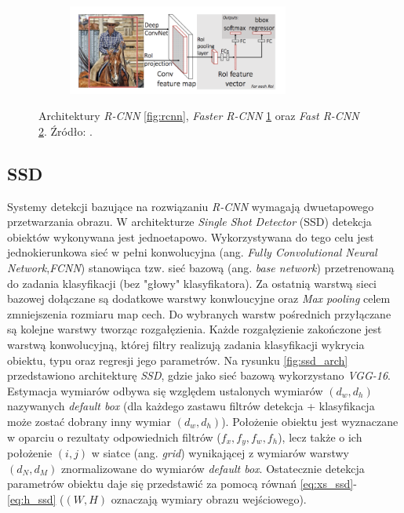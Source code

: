 \begin{figure}
\begin{subfigure}[b]{0.48\textwidth}
         \caption{}
         \label{fig:ffrcnn}
     \end{subfigure}
     \hfill
    \begin{subfigure}[b]{0.9\textwidth}
         \centering
         \includegraphics[width=0.8\textwidth]{images/frcnn.png}
         \caption{}
         \label{fig:frcnn}
     \end{subfigure}
     \hfill
    \caption{Architektury \emph{R-CNN} \ref{fig:rcnn}, \emph{Faster R-CNN} \ref{fig:ffrcnn} oraz \emph{Fast R-CNN} \ref{fig:frcnn}. Źródło: \cite{medium_rcnn}.}
    \label{fig:rcnns}
\end{figure}

\subsection{SSD}
Systemy detekcji bazujące na rozwiązaniu \emph{R-CNN} wymagają dwuetapowego przetwarzania obrazu.
W architekturze \emph{Single Shot Detector} (SSD) \cite{ssd} detekcja obiektów wykonywana jest jednoetapowo.
Wykorzystywana do tego celu jest jednokierunkowa sieć w pełni konwolucyjna (ang. \emph{Fully Convolutional Neural Network},\emph{FCNN}) stanowiąca tzw. sieć bazową (ang. \emph{base network}) przetrenowaną do zadania klasyfikacji (bez "głowy" klasyfikatora).
Za ostatnią warstwą sieci bazowej dołączane są dodatkowe warstwy konwloucyjne oraz \emph{Max pooling} celem zmniejszenia rozmiaru map cech.
Do wybranych warstw pośrednich przyłączane są kolejne warstwy tworząc rozgałęzienia.
Każde rozgałęzienie zakończone jest warstwą konwolucyjną, której filtry realizują zadania klasyfikacji wykrycia obiektu, typu oraz regresji jego parametrów. 
Na rysunku \ref{fig:ssd_arch} przedstawiono architekturę \emph{SSD}, gdzie jako sieć bazową wykorzystano \emph{VGG-16}. 
Estymacja wymiarów odbywa się względem ustalonych wymiarów $(d_w, d_h)$ nazywanych \emph{default box} (dla każdego zastawu filtrów detekcja + klasyfikacja może zostać dobrany inny wymiar $(d_w, d_h)$).
Położenie obiektu jest wyznaczane w oparciu o rezultaty odpowiednich filtrów ($f_x, f_y, f_w, f_h$), lecz także o ich położenie $(i,j)$ w siatce (ang. \emph{grid}) wynikającej z wymiarów warstwy $(d_N, d_M)$ znormalizowane do wymiarów \emph{default box}.
Ostatecznie detekcja parametrów obiektu daje się przedstawić za pomocą równań \eqref{eq:xs_ssd}-\eqref{eq:h_ssd} ($(W, H)$ oznaczają wymiary obrazu wejściowego). 

